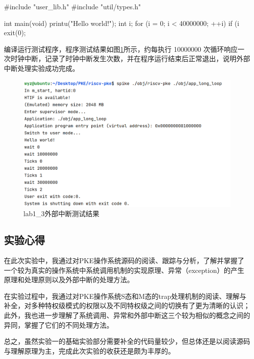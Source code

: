 \begin{cppcode}
#include "user_lib.h"
#include "util/types.h"

int main(void) {
  printu("Hello world!\n");
  int i;
  for (i = 0; i < 40000000; ++i) {
    if (i %
  }
  exit(0);
}
\end{cppcode}
编译运行测试程序，程序测试结果如图\ref{fig:lab1-3-testres}所示，约每执行 10000000 次循环响应一次时钟中断，记录了时钟中断发生次数，并在程序运行结束后正常退出，说明外部中断处理实验成功完成。
\begin{figure}[!htbp]
    \centering
    \includegraphics[width = 12cm]{figure/lab1_3_testresult.png}
    \caption{lab1_3外部中断测试结果}
    \label{fig:lab1-3-testres}
\end{figure}
\subsection{实验心得}
在此次实验中，我通过对PKE操作系统源码的阅读、跟踪与分析，了解并掌握了一个较为真实的操作系统中系统调用机制的实现原理、异常（exception）的产生原理和处理原则以及外部中断的处理方法。

在实验过程中，我通过对PKE操作系统S态和M态的trap处理机制的阅读、理解与补全，对多种特权级模式的权限以及不同特权级之间的切换有了更为清晰的认识；此外，我也进一步理解了系统调用、异常和外部中断这三个较为相似的概念之间的异同，掌握了它们的不同处理方法。

总之，虽然实验一的基础实验部分需要补全的代码量较少，但总体还是以阅读源码与理解原理为主，完成此次实验的收获还是颇为丰厚的。


